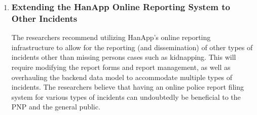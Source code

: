 \begin{enumerate}
    \item \subsubsection{Extending the HanApp Online Reporting  System to Other Incidents}
The researchers recommend utilizing HanApp’s online reporting infrastructure to allow for the reporting (and dissemination) of other types of incidents other than missing persons cases such as kidnapping. This will require modifying the report forms and report management, as well as overhauling the backend data model to accommodate multiple types of incidents. The researchers believe that having an online police report filing system for various types of incidents can undoubtedly be beneficial to the PNP and the general public. 

\end{enumerate}